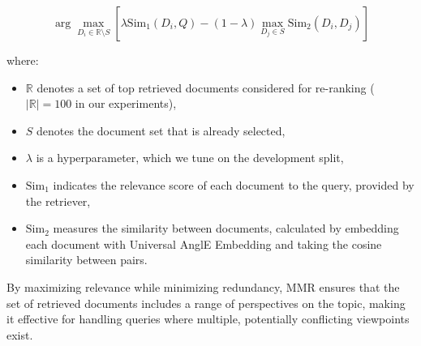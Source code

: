 \documentclass[sigconf]{acmart}
\begin{document}
\begin{enumerate}[left=0em]
\[
\arg \max_{D_i \in \mathbb{R} \setminus S} \left[ \lambda \text{Sim}_1(D_i, Q) - (1 - \lambda) \max_{D_j \in S} \text{Sim}_2(D_i, D_j) \right]
\]

where:
\begin{itemize}[left=0em]
    \item \( \mathbb{R} \) denotes a set of top retrieved documents considered for re-ranking (\(|\mathbb{R}| = 100\) in our experiments),
    \item \( S \) denotes the document set that is already selected,
    \item \( \lambda \) is a hyperparameter, which we tune on the development split,
    \item \(\text{Sim}_1\) indicates the relevance score of each document to the query, provided by the retriever,
    \item \(\text{Sim}_2\) measures the similarity between documents, calculated by embedding each document with Universal AnglE Embedding and taking the cosine similarity between pairs.
\end{itemize}

By maximizing relevance while minimizing redundancy, MMR ensures that the set of retrieved documents includes a range of perspectives on the topic, making it effective for handling queries where multiple, potentially conflicting viewpoints exist.

\end{enumerate}

\end{document}
